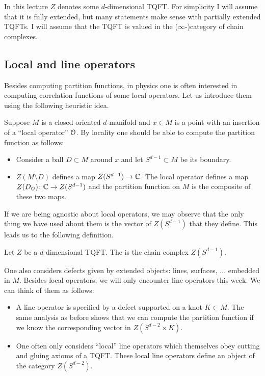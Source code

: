
In this lecture $Z$ denotes some $d$-dimensional TQFT. For simplicity I will assume that it is fully extended, but many statements make sense with partially extended TQFTs. I will assume that the TQFT is valued in the ($\infty$-)category of chain complexes.

\subsection{Local and line operators}

Besides computing partition functions, in physics one is often interested in computing correlation functions of some local operators. Let us introduce them using the following heuristic idea.

Suppose $M$ is a closed oriented $d$-manifold and $x\in M$ is a point with an insertion of a ``local operator'' $\mathcal{O}$. By locality one should be able to compute the partition function as follows:
\begin{itemize}
\item Consider a ball $D\subset M$ around $x$ and let $S^{d-1}\subset M$ be its boundary.
\item $Z(M\setminus D)$ defines a map $Z(S^{d-1})\rightarrow \mathbb{C}$. The local operator defines a map $Z(D_{\mathcal{O}})\colon \mathbb{C}\rightarrow Z(S^{d-1})$ and the partition function on $M$ is the composite of these two maps.
\end{itemize}

If we are being agnostic about local operators, we may observe that the only thing we have used about them is the vector of $Z(S^{d-1})$ that they define. This leads us to the following definition.

\begin{defn}
Let $Z$ be a $d$-dimensional TQFT. The  is the chain complex $Z(S^{d-1})$.
\end{defn}

One also considers defects given by extended objects: lines, surfaces, ... embedded in $M$. Besides local operators, we will only encounter line operators this week. We can think of them as follows:
\begin{itemize}
\item A line operator is specified by a defect supported on a knot $K\subset M$. The same analysis as before shows that we can compute the partition function if we know the corresponding vector in $Z(S^{d-2}\times K)$.

\item One often only considers ``local'' line operators which themselves obey cutting and gluing axioms of a TQFT. These local line operators define an object of the category $Z(S^{d-2})$.
\end{itemize}


